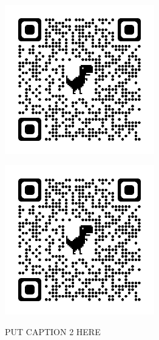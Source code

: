 \documentclass[a4paper,10pt]{article}
\begin{document}
\begin{center}
    \begin{minipage}{0.45\textwidth}
        \centering
        \includegraphics[width=6.5cm, height=6.5cm]{Figures/Apple.png}
        \label{fig:image3}
    \end{minipage}
    \hspace{0.05\textwidth}
    \begin{minipage}{0.45\textwidth}
        \centering
        \includegraphics[width=6.5cm, height=6.5cm]{Figures/Apple.png}
        \label{fig:image4}
    \end{minipage}
    PUT CAPTION 2 HERE
    \vspace{0.5cm} %


\end{center}
\end{document}
